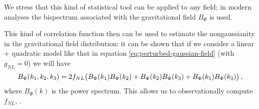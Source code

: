 \documentclass[main.tex]{subfiles}
\begin{document}
We stress that this kind of statistical tool can be applied to any field; in modern analyses the bispectrum associated with the gravitational field \cite[eq.\ 2]{celoriaPrimordialNonGaussianity2018} \(B_\Phi \) is used.

This kind of correlation function then can be used to estimate the nongaussianity in the gravitational field distribution: it can be shown that if we consider a linear + quadratic model like that in equation \eqref{eq:perturbed-gaussian-field} (with \(g_{NL} = 0\)) we will have 
%
\begin{align}
B_{\Phi } (k_1, k_2, k_3 ) = 2 f_{NL}
\qty(B_\Phi (k_1 ) B_\Phi (k_2 ) + B_\Phi (k_2 ) B_\Phi (k_3) + B_\Phi (k_1 ) B_\Phi (k_3 ))
\,,
\end{align}
%
where \(B_\Phi (k)\) is the power spectrum. 
This allows us to observationally compute \(f_{NL}\),  \cite[]{planckcollaborationPlanck2018Results2020}. 

%




\end{document}
